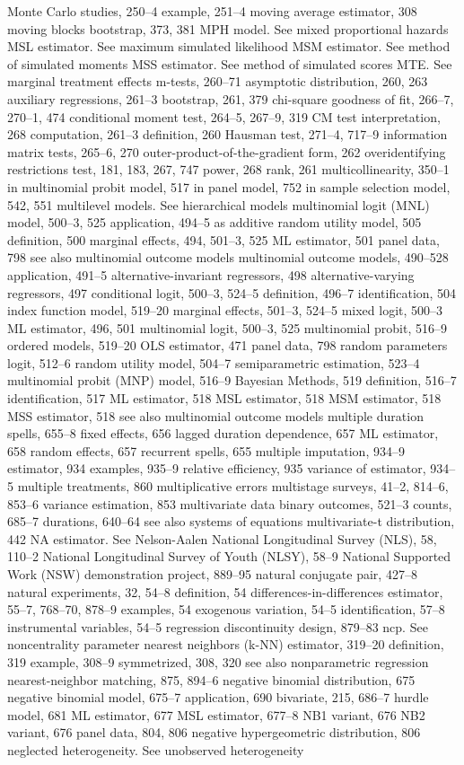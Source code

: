 Monte Carlo studies, 250–4 example, 251–4
moving average estimator, 308
moving blocks bootstrap, 373, 381
MPH model. See mixed proportional hazards
MSL estimator. See maximum simulated likelihood MSM estimator. See method of simulated moments MSS estimator. See method of simulated scores MTE. See marginal treatment effects
m-tests, 260–71
asymptotic distribution, 260, 263 auxiliary regressions, 261–3
bootstrap, 261, 379
chi-square goodness of fit, 266–7, 270–1,
474
conditional moment test, 264–5, 267–9, 319 CM test interpretation, 268
computation, 261–3
definition, 260
Hausman test, 271–4, 717–9
information matrix tests, 265–6, 270 outer-product-of-the-gradient form, 262 overidentifying restrictions test, 181, 183, 267,
747 power, 268 rank, 261
multicollinearity, 350–1
in multinomial probit model, 517
in panel model, 752
in sample selection model, 542, 551
multilevel models. See hierarchical models multinomial logit (MNL) model, 500–3, 525
application, 494–5
as additive random utility model, 505 definition, 500
marginal effects, 494, 501–3, 525 ML estimator, 501
panel data, 798
see also multinomial outcome models
multinomial outcome models, 490–528 application, 491–5 alternative-invariant regressors, 498 alternative-varying regressors, 497 conditional logit, 500–3, 524–5 definition, 496–7
identification, 504
index function model, 519–20 marginal effects, 501–3, 524–5 mixed logit, 500–3
ML estimator, 496, 501 multinomial logit, 500–3, 525 multinomial probit, 516–9 ordered models, 519–20
OLS estimator, 471
panel data, 798
random parameters logit, 512–6 random utility model, 504–7 semiparametric estimation, 523–4
multinomial probit (MNP) model, 516–9 Bayesian Methods, 519
definition, 516–7
identification, 517
ML estimator, 518
MSL estimator, 518
MSM estimator, 518
MSS estimator, 518
see also multinomial outcome models
multiple duration spells, 655–8 fixed effects, 656
lagged duration dependence, 657 ML estimator, 658
random effects, 657
recurrent spells, 655 multiple imputation, 934–9
estimator, 934
examples, 935–9
relative efficiency, 935 variance of estimator, 934–5
multiple treatments, 860
multiplicative errors
multistage surveys, 41–2, 814–6, 853–6
variance estimation, 853 multivariate data
binary outcomes, 521–3 counts, 685–7
durations, 640–64
see also systems of equations
multivariate-t distribution, 442
NA estimator. See Nelson-Aalen
National Longitudinal Survey (NLS), 58, 110–2 National Longitudinal Survey of Youth (NLSY),
58–9
National Supported Work (NSW) demonstration
project, 889–95
natural conjugate pair, 427–8 natural experiments, 32, 54–8
definition, 54
differences-in-differences estimator, 55–7, 768–70,
878–9
examples, 54
exogenous variation, 54–5 identification, 57–8
instrumental variables, 54–5
regression discontinuity design, 879–83
ncp. See noncentrality parameter
nearest neighbors (k-NN) estimator, 319–20
definition, 319
example, 308–9
symmetrized, 308, 320
see also nonparametric regression
nearest-neighbor matching, 875, 894–6 negative binomial distribution, 675 negative binomial model, 675–7
application, 690 bivariate, 215, 686–7 hurdle model, 681 ML estimator, 677 MSL estimator, 677–8 NB1 variant, 676 NB2 variant, 676 panel data, 804, 806
negative hypergeometric distribution, 806 neglected heterogeneity. See unobserved
heterogeneity

